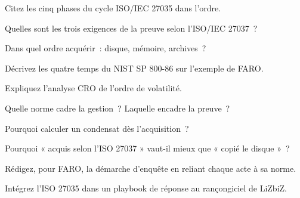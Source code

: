 \bigskip

\begin{boxexo}[title={\ding{45}\quad Exercice~8.1. Cinq phases \niveaubase}]
Citez les cinq phases du cycle ISO/IEC 27035 dans l'ordre.
\end{boxexo}

\begin{boxexo}[title={\ding{45}\quad Exercice~8.2. Exigences \niveaubase}]
Quelles sont les trois exigences de la preuve selon l'ISO/IEC 27037~?
\end{boxexo}

\begin{boxexo}[title={\ding{45}\quad Exercice~8.3. Volatilité \niveaubase}]
Dans quel ordre acquérir~: disque, mémoire, archives~?
\end{boxexo}

\begin{boxexo}[title={\ding{45}\quad Exercice~8.4. 800-86 \niveaumoyen}]
Décrivez les quatre temps du NIST SP 800-86 sur l'exemple de FARO.
\end{boxexo}

\begin{boxexo}[title={\ding{45}\quad Exercice~8.5. CRO \niveaumoyen}]
Expliquez l'analyse CRO de l'ordre de volatilité.
\end{boxexo}

\begin{boxexo}[title={\ding{45}\quad Exercice~8.6. Articulation \niveaumoyen}]
Quelle norme cadre la gestion~? Laquelle encadre la preuve~?
\end{boxexo}

\begin{boxexo}[title={\ding{45}\quad Exercice~8.7. Condensat \niveaumoyen}]
Pourquoi calculer un condensat dès l'acquisition~?
\end{boxexo}

\begin{boxexo}[title={\ding{45}\quad Exercice~8.8. Citer la norme \niveaumoyen}]
Pourquoi « acquis selon l'ISO 27037 » vaut-il mieux que « copié le disque »~?
\end{boxexo}

\begin{boxexo}[title={\ding{45}\quad Exercice~8.9. Démarche \niveauexpert}]
Rédigez, pour FARO, la démarche d'enquête en reliant chaque acte à sa norme.
\end{boxexo}

\begin{boxexo}[title={\ding{45}\quad Exercice~8.10. Playbook \niveauexpert}]
Intégrez l'ISO 27035 dans un playbook de réponse au rançongiciel de LiZbiZ.
\end{boxexo}

